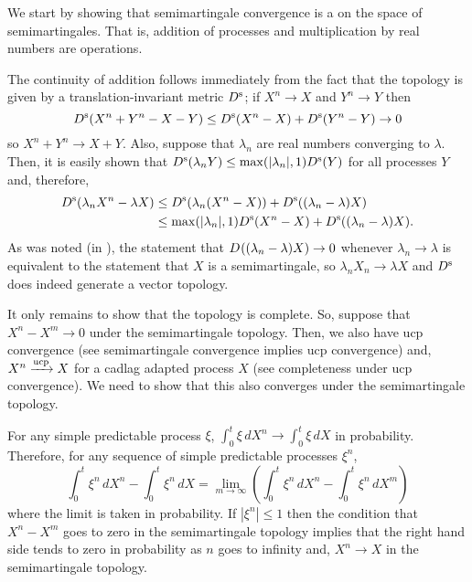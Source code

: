 \documentclass[12pt]{article}
\begin{document}
We start by showing that semimartingale convergence is a  on the space of semimartingales. That is, addition of processes and multiplication by real numbers are  operations.

The continuity of addition follows immediately from the fact that the topology is given by a translation-invariant metric $D^{\rm s}$; if $X^n\rightarrow X$ and $Y^n\rightarrow Y$ then
\begin{equation*}
D^{\rm s}(X^n+Y^n-X-Y)\le D^{\rm s}(X^n-X)+D^{\rm s}(Y^n-Y)\rightarrow 0
\end{equation*}
so $X^n+Y^n\rightarrow X+Y$.
Also, suppose that $\lambda_n$ are real numbers converging to $\lambda$. Then, it is easily shown that $D^{\rm s}(\lambda_nY)\le\max(|\lambda_n|,1)D^{\rm s}(Y)$ for all processes $Y$ and, therefore,
\begin{equation*}\begin{split}
D^{\rm s}(\lambda_nX^n-\lambda X)&\le D^{\rm s}(\lambda_n(X^n-X))+D^{\rm s}((\lambda_n-\lambda)X)\\
&\le \max(|\lambda_n|,1)D^{\rm s}(X^n-X)+D^{\rm s}((\lambda_n-\lambda)X).
\end{split}\end{equation*}
As was noted (in ), the statement that $D^{\rm}((\lambda_n-\lambda)X)\rightarrow 0$ whenever $\lambda_n\rightarrow \lambda$ is equivalent to the statement that $X$ is a semimartingale, so $\lambda_nX_n\rightarrow\lambda X$ and $D^{\rm s}$ does indeed generate a vector topology.

It only remains to show that the topology is complete.
So, suppose that $X^n-X^m\rightarrow 0$ under the semimartingale topology. Then, we also have ucp convergence (see semimartingale convergence implies ucp convergence) and, $X^n\xrightarrow{\rm ucp} X$ for a cadlag adapted process $X$ (see completeness under ucp convergence). We need to show that this also converges under the semimartingale topology.

For any simple predictable process $\xi$, $\int_0^t\xi\,dX^n\rightarrow\int_0^t\xi\,dX$ in probability. Therefore, for any sequence of simple predictable processes $\xi^n$,
\begin{equation*}
\int_0^t\xi^n\,dX^n-\int_0^t\xi^n\,dX
=\lim_{m\rightarrow \infty}\left(\int_0^t\xi^n\,dX^n-\int_0^t\xi^n\,dX^m\right)
\end{equation*}
where the limit is taken in probability. If $|\xi^n|\le 1$ then the condition that $X^n-X^m$ goes to zero in the semimartingale topology implies that the right hand side tends to zero in probability as $n$ goes to infinity and, $X^n\rightarrow X$ in the semimartingale topology.
\end{document}
